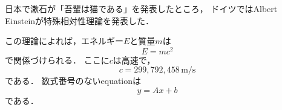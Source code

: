 \documentclass[a4paper, 11pt, uplatex]{jsarticle}
\begin{document}
日本で漱石が「吾輩は猫である」を発表したところ，
ドイツではAlbert Einsteinが特殊相対性理論を発表した．

この理論によれば，エネルギー$E$と質量$m$は
\begin {equation}
E = mc^{2}
\end{equation}
で関係づけられる．
ここに$c$は高速で，
\begin{equation}
	c = 299{,}792{,}458 \, \mathrm{m/s}
\end{equation}
である．
数式番号のないequationは
\[
	y = Ax + b
\]
である．
\end{document}
